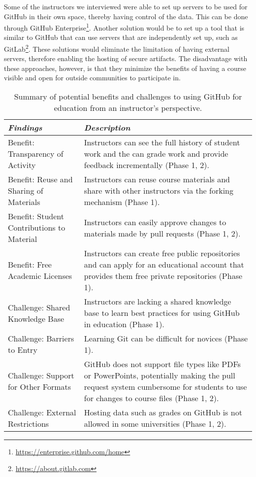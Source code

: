 Some of the instructors we interviewed were able to set up servers to be used for GitHub in their own space, thereby having control of the data. This can be done through GitHub Enterprise\footnote{\url{https://enterprise.github.com/home}}. Another solution would be to set up a tool that is similar to GitHub that can use servers that are independently set up, such as GitLab\footnote{\url{https://about.gitlab.com}}. These solutions would eliminate the limitation of having external servers, therefore enabling the hosting of secure artifacts. The disadvantage with these approaches, however, is that they minimize the benefits of having a course visible and open for outside communities to participate in.

\begin{table}[htp]
    \vspace{1pt}
        \caption{Summary of potential benefits and challenges to using GitHub for education from an instructor's perspective.}\label{table:findings:instructors}
    \vspace{1pt}
    \begin{center}
        \begin{tabular}{ | m{3cm} | m{12cm} | }
            \hline
            \emph{Findings} & \emph{Description} \\
            \hline
            Benefit: Transparency of Activity & Instructors can see the full history of student work and the can grade work and provide feedback incrementally (Phase 1, 2). \\
            \hline
            Benefit: Reuse and Sharing of Materials & Instructors can reuse course materials and share with other instructors via the forking mechanism (Phase 1). \\
            \hline
            Benefit: Student Contributions to Material & Instructors can easily approve changes to materials made by pull requests (Phase 1, 2). \\
            \hline
            Benefit: Free Academic Licenses & Instructors can create free public repositories and can apply for an educational account that provides them free private repositories (Phase 1). \\
            \hline
            Challenge: Shared Knowledge Base​ & Instructors are lacking a shared knowledge base to learn best practices for using GitHub in education (Phase 1). \\
            \hline
            Challenge: Barriers to Entry & Learning Git can be difficult for novices (Phase 1)​. \\
            \hline
            Challenge: Support for Other Formats & GitHub does not support file types like PDFs or PowerPoints, potentially making the pull request system cumbersome for students to use for changes to course files (Phase 1, 2). \\
            \hline
            Challenge: External Restrictions & Hosting data such as grades on GitHub is not allowed in some universities (Phase 1, 2). \\
            \hline
        \end{tabular}
    \end{center}
\end{table}

